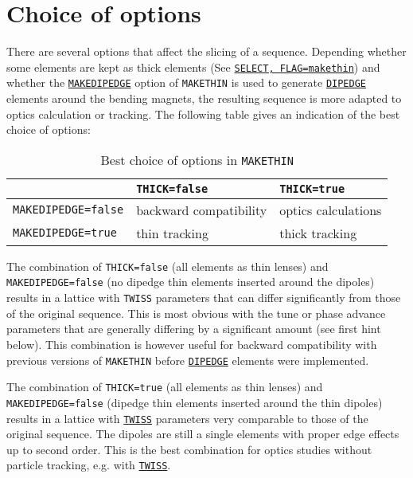 \section{Choice of options}

There are several options that affect the slicing of a sequence. 
Depending whether some elements are kept as thick elements 
(See \hyperref[sec:select]{\tt SELECT, FLAG=makethin}) and 
whether the \hyperref[sec:makethin]{\tt MAKEDIPEDGE} option 
of {\tt MAKETHIN} is used to generate 
\hyperref[sec:dipedge]{\tt DIPEDGE} elements around the bending magnets, 
the resulting sequence is more adapted to optics calculation or tracking. 
The following table gives an indication of the best choice of options: 

\begin{table}[ht]
\caption{Best choice of options in {\tt MAKETHIN}}
\vspace{1ex}
\begin{center}
	\begin{tabular}{|l|l|l|}
	\hline
	   & {\tt THICK=false} & {\tt THICK=true}\\
	\hline
	{\tt MAKEDIPEDGE=false} & backward compatibility & optics calculations \\
	\hline
	{\tt MAKEDIPEDGE=true} & thin tracking & thick tracking \\
	\hline
	\end{tabular}
	\end{center}
\end{table}

The combination of {\tt THICK=false} (all elements as thin lenses) 
and {\tt MAKEDIPEDGE=false} (no dipedge thin elements inserted 
around the dipoles) results in a lattice with {\tt TWISS} parameters 
that can differ significantly from those of the original sequence. 
This is most obvious with the tune or phase advance parameters 
that are generally differing by a significant amount (see first 
hint below). This combination is however useful for backward compatibility 
with previous versions of {\tt MAKETHIN} before 
\hyperref[sec:dipedge]{\tt DIPEDGE} elements were
implemented. 

The combination of {\tt THICK=true} (all elements as thin lenses) 
and {\tt MAKEDIPEDGE=false} (dipedge thin elements inserted 
around the thin dipoles) results in a lattice with 
\hyperref[chap:twiss]{\tt TWISS} parameters 
very comparable to those of the original sequence. The dipoles are still a 
single elements with proper edge effects up to second order.
This is the best combination for optics studies without particle tracking, 
e.g. with \hyperref[chap:twiss]{\tt TWISS}. 

